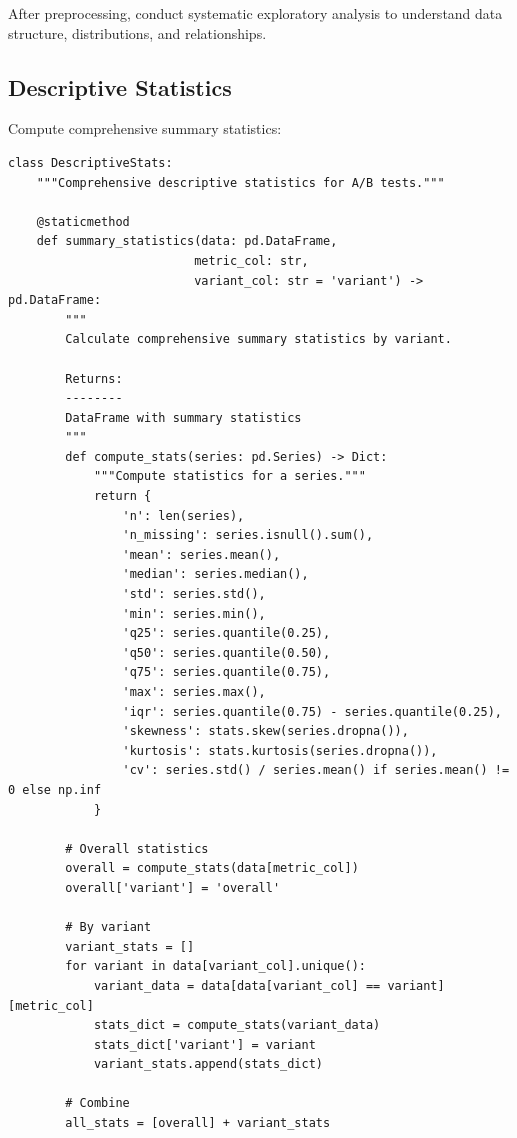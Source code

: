 After preprocessing, conduct systematic exploratory analysis to understand data structure, distributions, and relationships.

\subsection{Descriptive Statistics}

Compute comprehensive summary statistics:

\lstset{language=Python, caption=Descriptive Statistics Framework}
\begin{lstlisting}
class DescriptiveStats:
    """Comprehensive descriptive statistics for A/B tests."""

    @staticmethod
    def summary_statistics(data: pd.DataFrame,
                          metric_col: str,
                          variant_col: str = 'variant') -> pd.DataFrame:
        """
        Calculate comprehensive summary statistics by variant.

        Returns:
        --------
        DataFrame with summary statistics
        """
        def compute_stats(series: pd.Series) -> Dict:
            """Compute statistics for a series."""
            return {
                'n': len(series),
                'n_missing': series.isnull().sum(),
                'mean': series.mean(),
                'median': series.median(),
                'std': series.std(),
                'min': series.min(),
                'q25': series.quantile(0.25),
                'q50': series.quantile(0.50),
                'q75': series.quantile(0.75),
                'max': series.max(),
                'iqr': series.quantile(0.75) - series.quantile(0.25),
                'skewness': stats.skew(series.dropna()),
                'kurtosis': stats.kurtosis(series.dropna()),
                'cv': series.std() / series.mean() if series.mean() != 0 else np.inf
            }

        # Overall statistics
        overall = compute_stats(data[metric_col])
        overall['variant'] = 'overall'

        # By variant
        variant_stats = []
        for variant in data[variant_col].unique():
            variant_data = data[data[variant_col] == variant][metric_col]
            stats_dict = compute_stats(variant_data)
            stats_dict['variant'] = variant
            variant_stats.append(stats_dict)

        # Combine
        all_stats = [overall] + variant_stats


\end{lstlisting}
